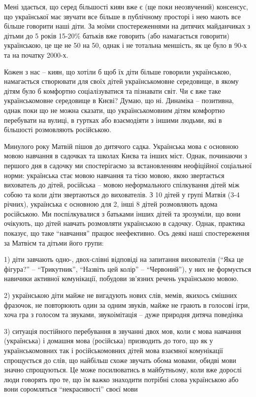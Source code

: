 Мені здається, що серед більшості киян вже є (ще поки неозвучений) консенсус,
що української має звучати все більше в публічному просторі і нею мають все
більше говорити наші діти. За моїми спостереженнями на дитячих майданчиках з
дітьми до 5 років 15-20\% батьків вже говорить (або намагається говорити)
українською, це ще не 50 на 50, однак і не тотальна меншість, як це було в 90-х
та на початку 2000-х.  

Кожен з нас – киян, що хотіли б щоб їх діти більше говорили українською,
намагається створювати для своїх дітей українськомовне середовище, в якому
дітям було б комфортно соціалізуватися та пізнавати світ. Чи є вже таке
українськомовне середовище в Києві? Думаю, що ні. Динаміка – позитивна, однак
поки що не можна сказати, що українськомовним дітям комфортно перебувати на
вулиці, в гуртках або взаємодіяти з іншими людьми, які в більшості розмовляють
російською.

Минулого року Матвій пішов до дитячого садка. Українська мова є основною мовою
навчання в садочках та школах Києва та інших міст. Однак, починаючи з першого
дня в садочку ми спостерігаємо за встановленням неофіційної соціальної норми:
українська стає мовою навчання та тією мовою, якою звертається вихователь до
дітей, російська – мовою неформального спілкування дітей між собою та коли діти
звертаються до вихователів. З 10 дітей у групі Матвія (3-4 річних), українська
є основною для 2, інші 8 дітей розмовляють вдома російською. Ми поспілкувалися
з батьками інших дітей та зрозуміли, що вони очікують, що дітей навчать
розмовляти українською в садочку. Однак, практика показує, що таке “навчання”
працює неефективно. Ось деякі наші спостереження за Матвієм та дітьми його
групи:

1) діти завчають одно-, двох-слівні відповіді на запитання вихователів (“Яка це
фігура?” – “Трикутник”, “Назвіть цей колір” – “Червоний”), у них не формується
навичики активної комунікації, побудови зв’язних речень українською мовою. 

2) українською діти майже не вигадують нових слів, мемів, якихось смішних
фразочок, не повторюють один за одним звуків, майже не грають в голосові ігри,
хоча гра з голосом та звуками, звукоімітація – дуже природня дитяча поведінка

3) ситуація постійного перебування в звучанні двох мов, коли є мова навчання
(українська) і домашня мова (російська) призводить до того, що як у
українськомовних так і російськомовних дітей мова взаємної комунікації
спрощується до слів, що найбільш схоже звучать обома мовами, обидві мови значно
спрощуються. Це може посилюватись в майбутньому, коли вже дорослі люди говорять
про те, що їм важко знаходити потрібні слова українською або вони соромляться
“некрасивості” своєї мови

